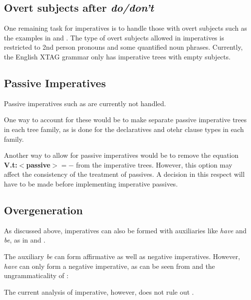 \subsection{Overt subjects after {\it do/don't}}
\label{sec:overt-subject}

One remaining task for imperatives is to handle those with overt subjects
such as the examples in  and .
The type of overt subjects allowed in imperatives is restricted to 2nd
person pronouns and some quantified noun phrases. Currently, the English
XTAG grammar only has imperative trees with empty subjects.  

\subsection{Passive Imperatives}

Passive imperatives such as  are currently not handled.


One way to account for these would be to make separate passive imperative trees
in each tree family, as is done for the declaratives and otehr clause types in
each family. 

Another way to allow for passive imperatives would be to remove the equation
{\bf V.t:$<$passive$> = -$} from the imperative trees. However, this option may
affect the consistency of the treatment of passives. A decision in this respect
will have to be made before implementing imperative passives.

\subsection{Overgeneration}

As discussed above, imperatives can also be formed with auxiliaries
like {\it have} and {\it be}, as in  and .



The auxiliary {\it be} can form affirmative as well as negative
imperatives. However, {\it have} can only form a negative imperative, as
can be seen from  and the ungrammaticality of :


The current analysis of imperative, however, does not rule out .










